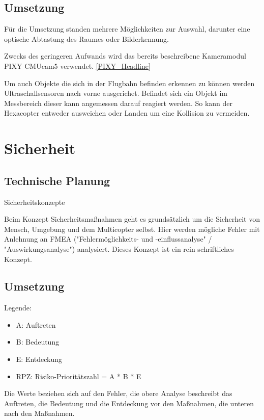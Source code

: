   \subsection{Umsetzung}
  Für die Umsetzung standen mehrere Möglichkeiten zur Auswahl, darunter eine optische Abtastung des Raumes oder Bilderkennung.

  Zwecks des geringeren Aufwands wird das bereits beschreibene Kameramodul PIXY CMUcam5 verwendet. \ref{PIXY_Headline}

  Um auch Objekte die sich in der Flugbahn befinden erkennen zu können werden Ultraschallsensoren nach vorne ausgerichet. Befindet sich ein Objekt im Messbereich dieser
  kann angemessen darauf reagiert werden. So kann der Hexacopter entweder ausweichen oder Landen um eine Kollision zu vermeiden.

\section{Sicherheit}

  \subsection{Technische Planung}

Sicherheitskonzepte

Beim Konzept Sicherheitsmaßnahmen geht es grundsätzlich um die Sicherheit von Mensch, Umgebung und dem Multicopter selbst. Hier werden mögliche Fehler mit Anlehnung an FMEA ("Fehlermöglichkeits- und -einflussanalyse" / "Auswirkungsanalyse") analysiert. Dieses Konzept ist ein rein schriftliches Konzept.

  \subsection{Umsetzung}

    Legende:
    \begin{itemize}
    \item A: Auftreten
    \item B: Bedeutung
    \item E: Entdeckung
    \item RPZ: Risiko-Prioritätszahl = A * B * E
    \end{itemize}

    Die Werte beziehen sich auf den Fehler, die obere Analyse beschreibt das Auftreten, die Bedeutung und die Entdeckung vor den Maßnahmen, die unteren nach den Maßnahmen.

